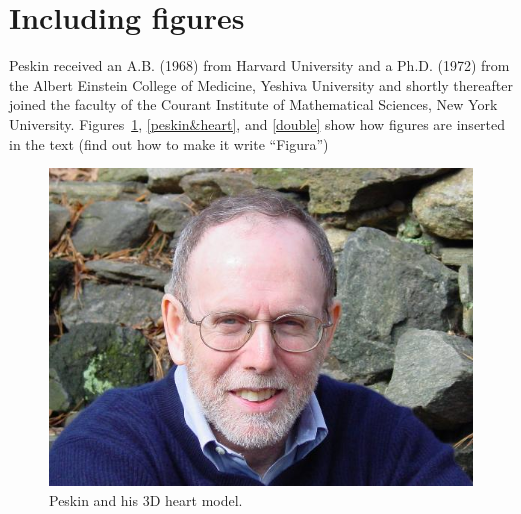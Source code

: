 \documentclass[a4paper,10pt]{article}
\begin{document}
\section{Including figures}
Peskin received an A.B. (1968) from Harvard University and a Ph.D. (1972) from the Albert Einstein College of Medicine, Yeshiva University and shortly thereafter joined the faculty of the Courant Institute of Mathematical Sciences, New York University. Figures~\ref{peskin}, \ref{peskin&heart}, and \ref{double} show how figures are inserted in the text (find out how to make it write ``Figura'')


\hspace{0.1pc}

\begin{figure}
\begin{center}
\includegraphics[scale=0.205]{figures/DSC01508_scale4.jpeg}
\end{center}
\caption{Peskin and his 3D heart model.}
\label{peskin}
\end{figure}
\end{document}
